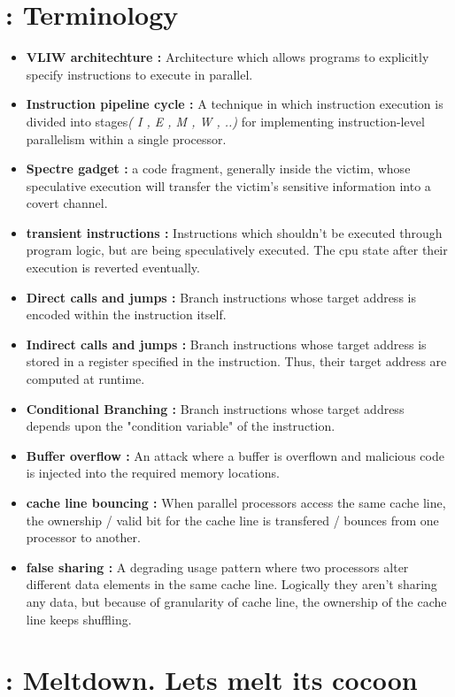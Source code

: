 \documentclass[12pt]{article}
\begin{document}
\begin{appendices}
	\section{: Terminology}
	\begin{itemize}
		\item \textbf{VLIW architechture : } Architecture which allows programs to explicitly specify instructions to execute in parallel. 
		\item \textbf{Instruction pipeline cycle : }  A technique in which instruction execution is divided into stages\textit{( I , E , M , W , ..)} for implementing instruction-level parallelism within a single processor. 
			\item \textbf{Spectre gadget :} a code fragment, generally inside the victim, whose speculative execution will transfer the victim’s sensitive information into a covert channel.
		\item \textbf{transient instructions : } Instructions which shouldn't be executed through program logic, but are being speculatively executed. The cpu state after their execution is reverted eventually.  
		\item \textbf{Direct calls and jumps : } Branch instructions whose target address is encoded within the instruction itself.
		\item \textbf{Indirect calls and jumps : } Branch instructions whose target address is stored in a register specified in the instruction. Thus, their target address are computed at runtime.
		\item \textbf{Conditional Branching : } Branch instructions whose target address depends upon the "condition variable" of the instruction.
		\item \textbf{Buffer overflow : }  An attack where a buffer is overflown and malicious code is injected into the required memory locations.
		\item \textbf{cache line bouncing : } When parallel processors access the same cache line, the ownership / valid bit for the cache line is transfered / bounces from one processor to another.
		\item \textbf{false sharing : }	 A degrading usage pattern where two processors alter different data elements in the same cache line. Logically they aren't sharing any data, but because of granularity of cache line, the ownership of the cache line keeps shuffling.
	\end{itemize}
	\newpage
	\section{: Meltdown. Lets melt its cocoon}
	

\end{appendices}
\end{document}
